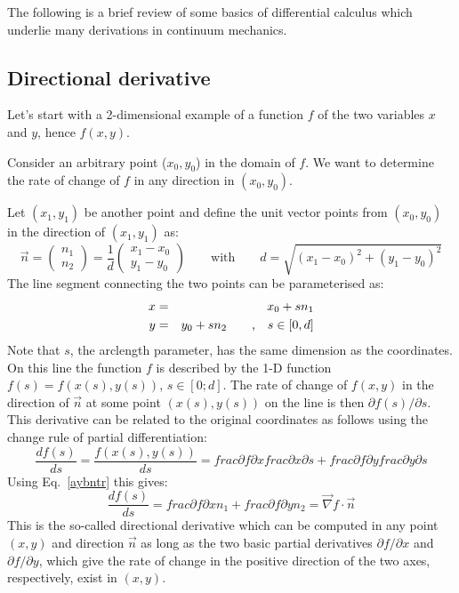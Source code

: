 
The following is a brief review of some basics of differential calculus which underlie many
derivations in continuum mechanics.

\subsection{Directional derivative}

Let's start with a 2-dimensional example of a function $f$ of the two variables $x$ and $y$, hence
$f(x,y)$.

Consider an arbitrary point ($x_0,y_0$) in the domain of $f$. 
We want to determine the rate of change of $f$ in any direction in $(x_0,y_0)$.

Let $(x_1,y_1)$ be another point and define the unit vector
points from $(x_0,y_0)$ in the direction of $(x_1,y_1)$ as:
\[
\vec{n} = 
\left(
\begin{array}{c}
n_1 \\ n_2
\end{array}
\right)
=
\frac{1}{d}
\left(
\begin{array}{c}
x_1-x_0 \\ 
y_1-y_0
\end{array}
\right)
\qquad\text{with}\qquad
d=\sqrt{(x_1-x_0)^2+(y_1-y_0)^2}
\]
The line segment connecting the two points can be
parameterised as:
\begin{eqnarray}
x &=& x_0 + s n_1 \nonumber\\
y &=& y_0 + s n_2 \qquad \text{,} \quad s\in[0,d]
\label{aybntr}
\end{eqnarray}
Note that $s$, the arclength parameter, has the same dimension as the coordinates. On this
line the function $f$ is described by the 1-D function $f(s) = f(x(s), y(s))$, $s \in [0;d]$. 
The rate of change of $f(x,y)$ in the direction of $\vec{n}$ at some point $(x(s),y(s))$ 
on the line is then $\partial f(s)/\partial s$. 
This derivative can be related to the original coordinates as follows using the change
rule of partial differentiation:
\[
\frac{d f(s)}{d s}
=
\frac{f(x(s),y(s))}{ds}
=
frac{\partial f}{\partial x}
frac{\partial x}{\partial s}
+
frac{\partial f}{\partial y}
frac{\partial y}{\partial s}
\]
Using Eq.~\eqref{aybntr} this gives:
\begin{equation}
\frac{d f(s)}{d s}
=
frac{\partial f}{\partial x} n_1
+
frac{\partial f}{\partial y} n_2
=
\vec\nabla f \cdot \vec{n}
\label{sgeoete}
\end{equation}
This is the so-called directional derivative which can be computed in any point $(x,y)$ and
direction $\vec{n}$ as long as the two basic partial derivatives 
$\partial f/\partial x$ and $\partial f/\partial y$, which give the rate of
change in the positive direction of the two axes, respectively, exist in $(x,y)$.

